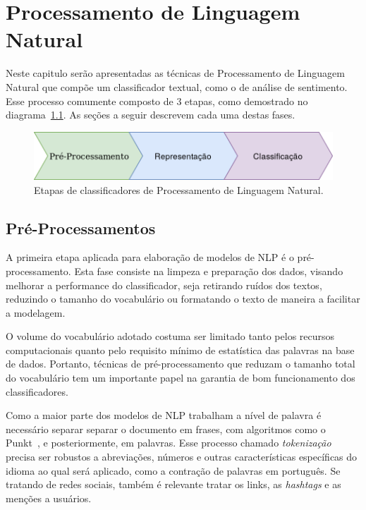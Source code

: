 \chapter{Processamento de Linguagem Natural}
\label{chapter:nlp}

Neste capitulo serão apresentadas as técnicas de Processamento de Linguagem
Natural que compõe um classificador textual, como o de análise de sentimento.
Esse processo comumente composto de 3 etapas, como demostrado no
diagrama~\ref{fig:nlp_diagram}.
As seções a seguir descrevem cada uma destas fases.

\begin{figure}[h]
\begin{center} {
    \begin{center}
    \includegraphics[scale=0.35]{images/nlp_diagram.png}
    \caption{Etapas de classificadores de Processamento de Linguagem Natural.}
    \label{fig:nlp_diagram}
    \end{center}
}
\end{center}
\end{figure}

\section{Pré-Processamentos}

A primeira etapa aplicada para elaboração de modelos de NLP é o
pré-processamento.
Esta fase consiste na limpeza e preparação dos dados, visando melhorar a
performance do classificador, seja retirando ruídos dos textos, reduzindo o
tamanho do vocabulário ou formatando o texto de maneira a facilitar a modelagem.

O volume do vocabulário adotado costuma ser limitado tanto pelos recursos
computacionais quanto pelo requisito mínimo de estatística das palavras na base
de dados.
Portanto, técnicas de pré-processamento que reduzam o tamanho total do
vocabulário tem um importante papel na garantia de bom funcionamento dos
classificadores.

Como a maior parte dos modelos de NLP trabalham a nível de palavra é necessário
separar separar o documento em frases, com algoritmos como o Punkt~\cite{kiss06},
e posteriormente, em palavras.
Esse processo chamado \textit{tokenização} precisa ser robustos a abreviações,
números e outras características específicas do idioma ao qual será aplicado,
como a contração de palavras em português.
Se tratando de redes sociais, também é relevante tratar os links, as
\textit{hashtags} e as menções a usuários.

